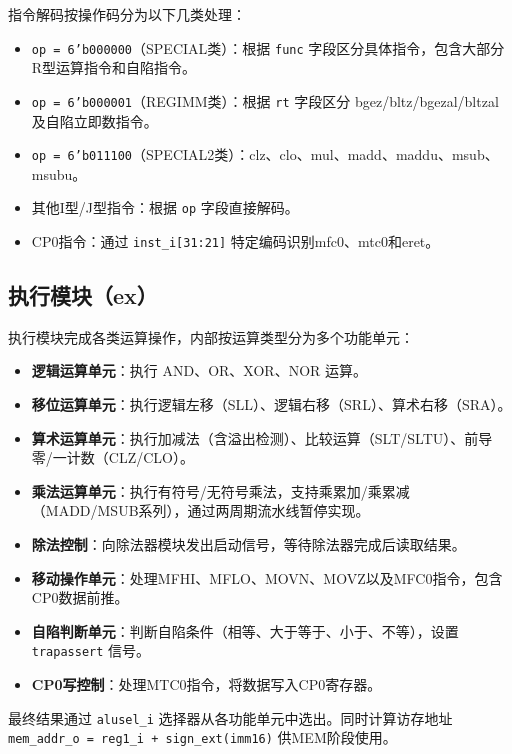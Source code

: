 指令解码按操作码分为以下几类处理：

\begin{itemize}[leftmargin=2em]
    \item \texttt{op = 6'b000000}（SPECIAL类）：根据 \texttt{func} 字段区分具体指令，包含大部分R型运算指令和自陷指令。
    \item \texttt{op = 6'b000001}（REGIMM类）：根据 \texttt{rt} 字段区分 bgez/bltz/bgezal/bltzal 及自陷立即数指令。
    \item \texttt{op = 6'b011100}（SPECIAL2类）：clz、clo、mul、madd、maddu、msub、msubu。
    \item 其他I型/J型指令：根据 \texttt{op} 字段直接解码。
    \item CP0指令：通过 \texttt{inst\_i[31:21]} 特定编码识别mfc0、mtc0和eret。
\end{itemize}

\subsection{执行模块（ex）}

执行模块完成各类运算操作，内部按运算类型分为多个功能单元：

\begin{itemize}[leftmargin=2em]
    \item \textbf{逻辑运算单元}：执行 AND、OR、XOR、NOR 运算。
    \item \textbf{移位运算单元}：执行逻辑左移（SLL）、逻辑右移（SRL）、算术右移（SRA）。
    \item \textbf{算术运算单元}：执行加减法（含溢出检测）、比较运算（SLT/SLTU）、前导零/一计数（CLZ/CLO）。
    \item \textbf{乘法运算单元}：执行有符号/无符号乘法，支持乘累加/乘累减（MADD/MSUB系列），通过两周期流水线暂停实现。
    \item \textbf{除法控制}：向除法器模块发出启动信号，等待除法器完成后读取结果。
    \item \textbf{移动操作单元}：处理MFHI、MFLO、MOVN、MOVZ以及MFC0指令，包含CP0数据前推。
    \item \textbf{自陷判断单元}：判断自陷条件（相等、大于等于、小于、不等），设置 \texttt{trapassert} 信号。
    \item \textbf{CP0写控制}：处理MTC0指令，将数据写入CP0寄存器。
\end{itemize}

最终结果通过 \texttt{alusel\_i} 选择器从各功能单元中选出。同时计算访存地址 \texttt{mem\_addr\_o = reg1\_i + sign\_ext(imm16)} 供MEM阶段使用。

